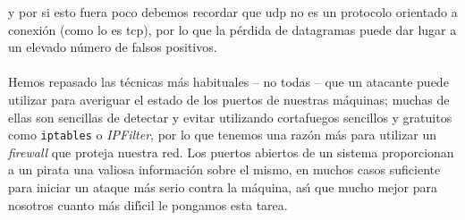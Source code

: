y por si esto fuera poco debemos recordar que {\sc udp} no es un protocolo 
orientado a conexi\'on (como lo es {\sc tcp}), por lo que la p\'erdida de
datagramas puede dar lugar a un elevado n\'umero de falsos positivos.\\
\\Hemos repasado las t\'ecnicas m\'as habituales -- no todas -- que un atacante 
puede utilizar para averiguar el estado de los puertos de nuestras m\'aquinas;
muchas de ellas son sencillas de detectar y evitar utilizando cortafuegos 
sencillos y gratuitos como {\tt iptables} o {\it IPFilter}, por lo que tenemos
una raz\'on m\'as para utilizar un {\it firewall} que proteja nuestra red. Los
puertos abiertos de un sistema proporcionan a un pirata una valiosa 
informaci\'on sobre el mismo, en muchos casos suficiente para iniciar un ataque 
m\'as serio contra la m\'aquina, as\'{\i} que mucho mejor para nosotros cuanto
m\'as dif\'{\i}cil le pongamos esta tarea.

